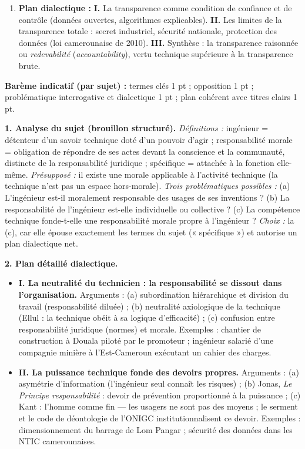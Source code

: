 \documentclass[11pt]{article}
\begin{document}
\begin{corrige}
\begin{enumerate}
    \item \textbf{Plan dialectique :} \textbf{I.} La transparence comme condition de confiance et de contrôle (données ouvertes, algorithmes explicables). \textbf{II.} Les limites de la transparence totale : secret industriel, sécurité nationale, protection des données (loi camerounaise de 2010). \textbf{III.} Synthèse : la transparence raisonnée ou \emph{redevabilité} (\emph{accountability}), vertu technique supérieure à la transparence brute.
\end{enumerate}
\textbf{Barème indicatif (par sujet) :} termes clés 1 pt ; opposition 1 pt ; problématique interrogative et dialectique 1 pt ; plan cohérent avec titres clairs 1 pt.
\end{corrige}

\begin{corrige}
\textbf{1. Analyse du sujet (brouillon structuré).} \emph{Définitions :} ingénieur = détenteur d'un savoir technique doté d'un pouvoir d'agir ; responsabilité morale = obligation de répondre de ses actes devant la conscience et la communauté, distincte de la responsabilité juridique ; spécifique = attachée à la fonction elle-même. \emph{Présupposé :} il existe une morale applicable à l'activité technique (la technique n'est pas un espace hors-morale). \emph{Trois problématiques possibles :} (a) L'ingénieur est-il moralement responsable des usages de ses inventions ? (b) La responsabilité de l'ingénieur est-elle individuelle ou collective ? (c) La compétence technique fonde-t-elle une responsabilité morale propre à l'ingénieur ? \emph{Choix :} la (c), car elle épouse exactement les termes du sujet (« spécifique ») et autorise un plan dialectique net.\par
\textbf{2. Plan détaillé dialectique.}
\begin{itemize}
    \item \textbf{I. La neutralité du technicien : la responsabilité se dissout dans l'organisation.} Arguments : (a) subordination hiérarchique et division du travail (responsabilité diluée) ; (b) neutralité axiologique de la technique (Ellul : la technique obéit à sa logique d'efficacité) ; (c) confusion entre responsabilité juridique (normes) et morale. Exemples : chantier de construction à Douala piloté par le promoteur ; ingénieur salarié d'une compagnie minière à l'Est-Cameroun exécutant un cahier des charges.
    \item \textbf{II. La puissance technique fonde des devoirs propres.} Arguments : (a) asymétrie d'information (l'ingénieur seul connaît les risques) ; (b) Jonas, \emph{Le Principe responsabilité} : devoir de prévention proportionné à la puissance ; (c) Kant : l'homme comme fin — les usagers ne sont pas des moyens ; le serment et le code de déontologie de l'ONIGC institutionnalisent ce devoir. Exemples : dimensionnement du barrage de Lom Pangar ; sécurité des données dans les NTIC camerounaises.

\end{itemize}
\end{corrige}
\end{document}
